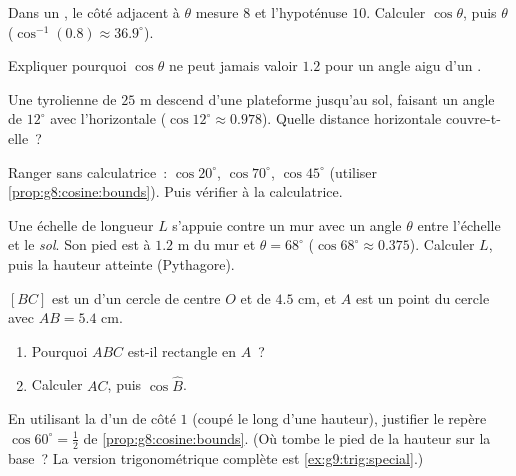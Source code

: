 \begin{exercise}[$\star$]\label{exo:g8:cosine:5}
Dans un , le côté adjacent à $\theta$ mesure $8$ et
l'hypoténuse $10$. Calculer $\cos\theta$, puis $\theta$
($\cos^{-1}(0.8) \approx 36.9^\circ$).
\end{exercise}

\begin{exercise}[$\star$]\label{exo:g8:cosine:6}
Expliquer pourquoi $\cos\theta$ ne peut jamais valoir $1.2$ pour un
angle aigu d'un .
\end{exercise}

\begin{exercise}[$\star\star$]\label{exo:g8:cosine:7}
Une tyrolienne de $25$ m descend d'une plateforme jusqu'au sol, faisant
un angle de $12^\circ$ avec l'horizontale ($\cos 12^\circ \approx
0.978$). Quelle distance horizontale couvre-t-elle~?
\end{exercise}

\begin{exercise}[$\star\star$]\label{exo:g8:cosine:8}
Ranger sans calculatrice~: $\cos 20^\circ$, $\cos 70^\circ$,
$\cos 45^\circ$ (utiliser \cref{prop:g8:cosine:bounds}). Puis
vérifier à la calculatrice.
\end{exercise}

\begin{exercise}[$\star\star$]\label{exo:g8:cosine:9}
Une échelle de longueur $L$ s'appuie contre un mur avec un angle
$\theta$ entre l'échelle et le \emph{sol}. Son pied est à $1.2$ m du
mur et $\theta = 68^\circ$ ($\cos 68^\circ \approx 0.375$). Calculer
$L$, puis la hauteur atteinte (Pythagore).
\end{exercise}

\begin{exercise}[$\star\star$]\label{exo:g8:cosine:10}
$[BC]$ est un  d'un cercle de centre $O$ et de 
$4.5$ cm, et $A$ est un point du cercle avec $AB = 5.4$ cm.
\begin{enumerate}
  \item Pourquoi $ABC$ est-il rectangle en $A$~?
  \item Calculer $AC$, puis $\cos \widehat B$.
\end{enumerate}
\end{exercise}

\begin{exercise}[$\star\star\star$]\label{exo:g8:cosine:11}
En utilisant la  d'un  de côté $1$ (coupé
le long d'une hauteur), justifier le repère $\cos 60^\circ = \frac12$
de \cref{prop:g8:cosine:bounds}. (Où tombe le pied de la hauteur sur
la base~? La version trigonométrique complète est
\cref{ex:g9:trig:special}.)
\end{exercise}

